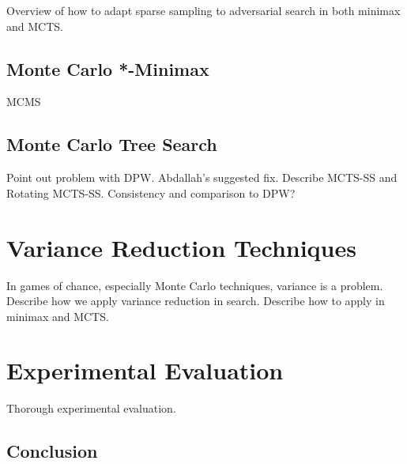 \documentclass[jair,twoside,11pt,theapa]{article}
\begin{document}
Overview of how to adapt sparse sampling to adversarial search in both minimax and MCTS.

\subsection{Monte Carlo *-Minimax}

MCMS~\cite{Lanctot13MCMS}

\subsection{Monte Carlo Tree Search}

Point out problem with DPW. Abdallah's suggested fix. Describe MCTS-SS and Rotating MCTS-SS. Consistency and comparison to DPW?

\section{Variance Reduction Techniques}

In games of chance, especially Monte Carlo techniques, variance is a problem. Describe how we apply variance reduction in search.
Describe how to apply in minimax and MCTS. 

\section{Experimental Evaluation}

Thorough experimental evaluation.

\subsection{Conclusion}





\end{document}
